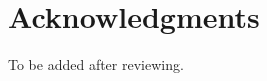 \documentclass{article}
\begin{document}
	\section*{Acknowledgments}
	To be added after reviewing.
	
	
	\small
	
	
	
\end{document}
